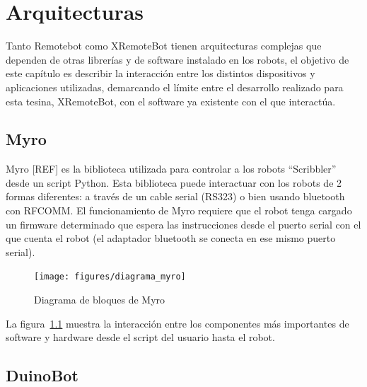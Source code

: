 \chapter{Arquitecturas}\label{cha:arquitectura}



Tanto Remotebot como XRemoteBot tienen arquitecturas complejas que
dependen de otras librerías y de software instalado en los robots,
el objetivo de este capítulo es describir la interacción entre los
distintos dispositivos y aplicaciones utilizadas, demarcando el límite
entre el desarrollo realizado para esta tesina, XRemoteBot, con el software ya
existente con el que interactúa.

\section{Myro}\label{sec:myro}

Myro [REF] es la biblioteca utilizada para controlar a los robots ``Scribbler''
desde un script Python. Esta biblioteca puede interactuar con los robots de 2
formas diferentes: a través de un cable serial (RS323) o bien usando bluetooth
con RFCOMM. El funcionamiento de Myro requiere que el robot tenga
cargado un firmware determinado que espera las instrucciones desde el puerto
serial con el que cuenta el robot (el adaptador bluetooth se conecta en ese
mismo puerto serial).

\begin{figure}
    \centering
    \texttt{[image: figures/diagrama\_myro]}
    \caption{Diagrama de bloques de Myro}
    \label{fig:diagrama_myro}
\end{figure}

La figura~\ref{fig:diagrama_myro} muestra la interacción entre los componentes
más importantes de software y hardware desde el script del usuario hasta el
robot.

\section{DuinoBot}\label{sec:duinobot}

